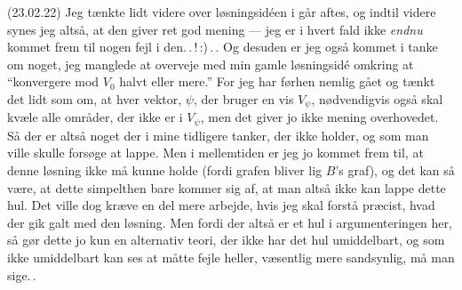 \documentclass{report}
\begin{document}
(23.02.22) Jeg tænkte lidt videre over løsningsidéen i går aftes, og indtil videre synes jeg altså, at den giver ret god mening --- jeg er i hvert fald ikke \emph{endnu} kommet frem til nogen fejl i den.\,.\,!\,:)\,.\,. Og desuden er jeg også kommet i tanke om noget, jeg manglede at overveje med min gamle løsningsidé omkring at ``konvergere mod $V_0$ halvt eller mere.'' For jeg har førhen nemlig gået og tænkt det lidt som om, at hver vektor, $\psi$, der bruger en vis $V_\psi$, nødvendigvis også skal kvæle alle områder, der ikke er i $V_\psi$, men det giver jo ikke mening overhovedet. Så der er altså noget der i mine tidligere tanker, der ikke holder, og som man ville skulle forsøge at lappe. Men i mellemtiden er jeg jo kommet frem til, at denne løsning ikke må kunne holde (fordi grafen bliver lig $B$'s graf), og det kan så være, at dette simpelthen bare kommer sig af, at man altså ikke kan lappe dette hul. Det ville dog kræve en del mere arbejde, hvis jeg skal forstå præcist, hvad der gik galt med den løsning. Men fordi der altså er et hul i argumenteringen her, så gør dette jo kun en alternativ teori, der ikke har det hul umiddelbart, og som ikke umiddelbart kan ses at måtte fejle heller, væsentlig mere sandsynlig, må man sige.\,. 
\end{document}
